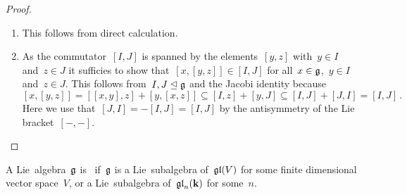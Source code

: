 \begin{proof}
  \leavevmode
  \begin{enumerate}
    \item
      This follows from direct calculation.
    \item
      As the commutator~$[I,J]$ is spanned by the elements~$[y,z]$ with~$y \in I$ and~$z \in J$ it sufficies to show that~$[x,[y,z]] \in [I,J]$ for all~$x \in \mathfrak{g}$,~$y \in I$ and~$z \in J$.
      This follows from~$I, J \trianglelefteq \mathfrak{g}$ and the Jacobi identity because
      \[
        [x,[y,z]]
        =
        [[x,y], z] + [y, [x,z]]
        \subseteq
        [I, z] + [y, J]
        \subseteq
        [I, J] + [J, I]
        =
        [I,J] \,.
      \]
      Here we use that~$[J,I] = -[I,J] = [I,J]$ by the antisymmetry of the Lie bracket~$[-,-]$.
   \qedhere
 \end{enumerate}
\end{proof}


\begin{definition}
  A Lie~algebra~$\mathfrak{g}$ is~ if~$\mathfrak{g}$ is a Lie~subalgebra of~$\mathfrak{gl}(V)$ for some finite dimensional vector space~$V$, or a Lie~subalgebra of~$\mathfrak{gl}_n(\mathbf{k})$ for some~$n$.
\end{definition}


